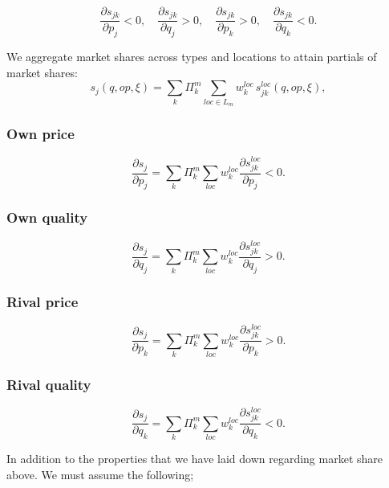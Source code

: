\documentclass[12pt]{article}
\begin{document}
\[
\frac{\partial s_{jk}}{\partial p_j} < 0, \quad
\frac{\partial s_{jk}}{\partial q_j} > 0, \quad
\frac{\partial s_{jk}}{\partial p_k} > 0, \quad
\frac{\partial s_{jk}}{\partial q_k} < 0.
\]

We aggregate market shares across types and locations to attain partials of market shares:
\begin{equation}
s_j(q,op,\xi)
=
\sum_{k} \Pi_k^m
\sum_{loc \in L_m}
w_k^{loc}
\, s_{jk}^{loc}(q,op,\xi),
\end{equation}

\subsubsection*{Own price}

\begin{equation}
\frac{\partial s_j}{\partial p_j}
=
\sum_k \Pi_k^m
\sum_{loc}
w_k^{loc}
\frac{\partial s_{jk}^{loc}}{\partial p_j}
< 0.
\end{equation}

\subsubsection*{Own quality}

\begin{equation}
\frac{\partial s_j}{\partial q_j}
=
\sum_k \Pi_k^m
\sum_{loc}
w_k^{loc}
\frac{\partial s_{jk}^{loc}}{\partial q_j}
> 0.
\end{equation}

\subsubsection*{Rival price}

\begin{equation}
\frac{\partial s_j}{\partial p_k}
=
\sum_k \Pi_k^m
\sum_{loc}
w_k^{loc}
\frac{\partial s_{jk}^{loc}}{\partial p_k}
> 0.
\end{equation}

\subsubsection*{Rival quality}

\begin{equation}
\frac{\partial s_j}{\partial q_k}
=
\sum_k \Pi_k^m
\sum_{loc}
w_k^{loc}
\frac{\partial s_{jk}^{loc}}{\partial q_k}
< 0.
\end{equation}

In addition to the properties that we have laid down regarding market share above. We must assume the following;
\end{document}
